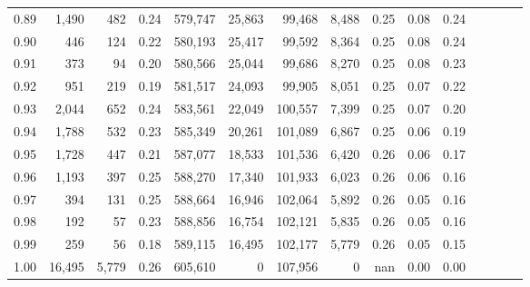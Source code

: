 \begin{tabular}{rrrcrrrrrrrrrrr}
0.89 &   1,490 &    482 &                                       0.24 &  579,747 &   25,863 &   99,468 &    8,488 &  0.25 &  0.08 &                         0.24 \\
0.90 &     446 &    124 &                                       0.22 &  580,193 &   25,417 &   99,592 &    8,364 &  0.25 &  0.08 &                         0.24 \\
0.91 &     373 &     94 &                                       0.20 &  580,566 &   25,044 &   99,686 &    8,270 &  0.25 &  0.08 &                         0.23 \\
0.92 &     951 &    219 &                                       0.19 &  581,517 &   24,093 &   99,905 &    8,051 &  0.25 &  0.07 &                         0.22 \\
0.93 &   2,044 &    652 &                                       0.24 &  583,561 &   22,049 &  100,557 &    7,399 &  0.25 &  0.07 &                         0.20 \\
0.94 &   1,788 &    532 &                                       0.23 &  585,349 &   20,261 &  101,089 &    6,867 &  0.25 &  0.06 &                         0.19 \\
0.95 &   1,728 &    447 &                                       0.21 &  587,077 &   18,533 &  101,536 &    6,420 &  0.26 &  0.06 &                         0.17 \\
0.96 &   1,193 &    397 &                                       0.25 &  588,270 &   17,340 &  101,933 &    6,023 &  0.26 &  0.06 &                         0.16 \\
0.97 &     394 &    131 &                                       0.25 &  588,664 &   16,946 &  102,064 &    5,892 &  0.26 &  0.05 &                         0.16 \\
0.98 &     192 &     57 &                                       0.23 &  588,856 &   16,754 &  102,121 &    5,835 &  0.26 &  0.05 &                         0.16 \\
0.99 &     259 &     56 &                                       0.18 &  589,115 &   16,495 &  102,177 &    5,779 &  0.26 &  0.05 &                         0.15 \\
1.00 &  16,495 &  5,779 &                                       0.26 &  605,610 &        0 &  107,956 &        0 &   nan &  0.00 &                         0.00 \\
\bottomrule
\end{tabular}
